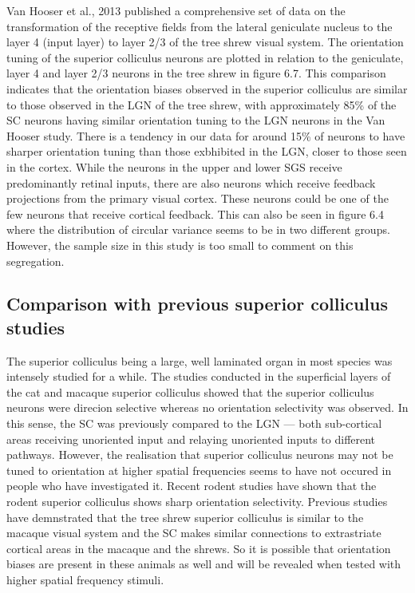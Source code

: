 		Van Hooser et al., 2013 published a comprehensive set of data on the transformation of the receptive fields from the lateral geniculate nucleus to the layer 4 (input layer) to layer 2/3 of the tree shrew visual system. The orientation tuning of the superior colliculus neurons are plotted in relation to the geniculate, layer 4 and layer 2/3 neurons in the tree shrew in figure 6.7. This comparison indicates that the orientation biases observed in the superior colliculus are similar to those observed in the LGN of the tree shrew, with approximately 85\% of the SC neurons having similar orientation tuning to the LGN neurons in the Van Hooser study. There is a tendency in our data for around 15\% of neurons to have sharper orientation tuning than those exbhibited in the LGN, closer to those seen in the cortex. While the neurons in the upper and lower SGS receive predominantly retinal inputs, there are also neurons which receive feedback projections from the primary visual cortex. These neurons could be one of the few neurons that receive cortical feedback. This can also be seen in figure 6.4 where the distribution of circular variance seems to be in two different groups. However, the sample size in this study is too small to comment on this segregation.
		
		\subsection{Comparison with previous superior colliculus studies}
		
		The superior colliculus being a large, well laminated organ in most species was intensely studied for a while. The studies conducted in the superficial layers of the cat and macaque superior colliculus showed that the superior colliculus neurons were direcion selective whereas no orientation selectivity was observed. In this sense, the SC was previously compared to the LGN — both sub-cortical areas receiving unoriented input and relaying unoriented inputs to different pathways. However, the realisation that superior colliculus neurons may not be tuned to orientation at higher spatial frequencies seems to have not occured in people who have investigated it. Recent rodent studies have shown that the rodent superior colliculus shows sharp orientation selectivity. Previous studies have demnstrated that the tree shrew superior colliculus is similar to the macaque visual system and the SC makes similar connections to extrastriate cortical areas in the macaque and the shrews. So it is possible that orientation biases are present in these animals as well and will be revealed when tested with higher spatial frequency stimuli.
		
